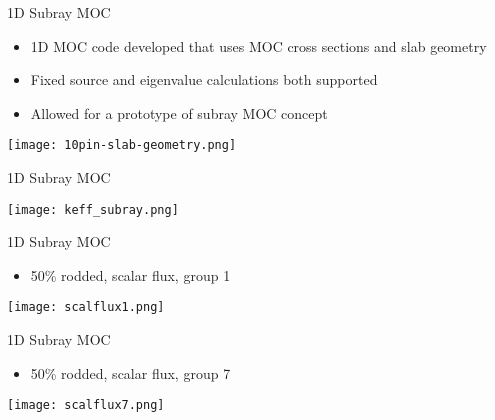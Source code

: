 \begin{frame}[t]{1D Subray MOC}

\begin{itemize}
    \item 1D MOC code developed that uses MOC cross sections and slab geometry
    \item Fixed source and eigenvalue calculations both supported
    \item Allowed for a prototype of subray MOC concept
\end{itemize}
\begin{center}
    \texttt{[image: 10pin-slab-geometry.png]}
\end{center}

\end{frame}


\begin{frame}[t]{1D Subray MOC}

\begin{center}
    \texttt{[image: keff\_subray.png]}
\end{center}

\end{frame}


\begin{frame}[t]{1D Subray MOC}

\begin{itemize}
    \item 50\% rodded, scalar flux, group 1
\end{itemize}
\begin{center}
    \texttt{[image: scalflux1.png]}
\end{center}

\end{frame}


\begin{frame}[t]{1D Subray MOC}

\begin{itemize}
\item 50\% rodded, scalar flux, group 7
\end{itemize}
\begin{center}
\texttt{[image: scalflux7.png]}
\end{center}

\end{frame}